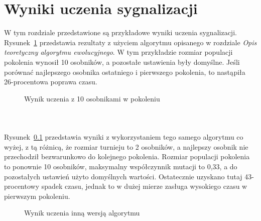 \chapter*{Wyniki uczenia sygnalizacji}
W tym rozdziale przedstawione są przykładowe wyniki uczenia sygnalizacji.\\
Rysunek~\ref{fig:evoA} przedstawia rezultaty z użyciem algorytmu opisanego w rozdziale \textit{Opis teoretyczny algorytmu ewolucyjnego}. W tym przykładzie rozmiar populacji pokolenia wynosił 10 osobników, a pozostałe ustawienia były domyślne. Jeśli porównać najlepszego osobnika  ostatniego i pierwszego pokolenia, to nastąpiła 26-procentowa poprawa czasu.
\evoA
\begin{figure}[h]
	\centering
	\caption{Wynik uczenia z 10 osobnikami w pokoleniu}
	\label{fig:evoA}
\end{figure}\\
\paragraph{}Rysunek~\ref{fig:evoB} przedstawia wyniki z wykorzystaniem tego samego algorytmu co wyżej, z tą różnicą, że rozmiar turnieju to 2 osobników, a najlepszy osobnik nie przechodził bezwarunkowo do kolejnego pokolenia. Rozmiar populacji pokolenia to ponownie 10 osobników, maksymalny współczynnik mutacji to 0,33, a do pozostałych ustawień użyto domyślnych wartości. Ostatecznie uzyskano tutaj 43-procentowy spadek czasu, jednak to w dużej mierze zasługa wysokiego czasu w pierwszym pokoleniu.
\evoB
\begin{figure}[h]
	\centering
	\caption{Wynik uczenia inną wersją algorytmu}
	\label{fig:evoB}
\end{figure}

